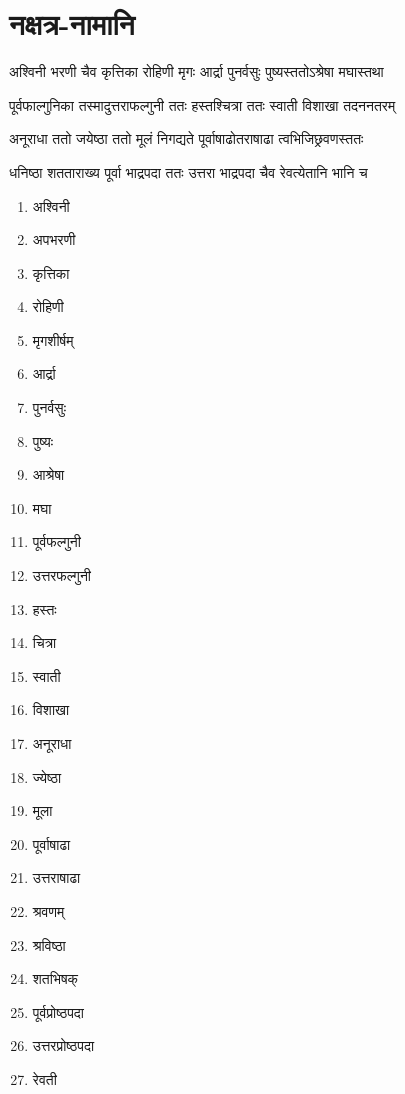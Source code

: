 \section{नक्षत्र-नामानि}
\label{app:nakshatra_names}

\twolineshloka
{अश्विनी भरणी चैव कृत्तिका रोहिणी मृगः}
{आर्द्रा पुनर्वसुः पुष्यस्ततोऽश्रेषा मघास्तथा}

\twolineshloka
{पूर्वफाल्गुनिका तस्मादुत्तराफल्गुनी ततः}
{हस्तश्चित्रा ततः स्वाती विशाखा तदननतरम्}

\twolineshloka
{अनूराधा ततो जयेष्ठा ततो मूलं निगद्यते}
{पूर्वाषाढोतराषाढा त्वभिजिछ्रवणस्ततः}

\twolineshloka
{धनिष्ठा शतताराख्य पूर्वा भाद्रपदा ततः}
{उत्तरा भाद्रपदा चैव रेवत्येतानि भानि च}


\begin{multicols}{2}
\begin{enumerate}
\item अश्विनी
\item अपभरणी
\item कृत्तिका
\item रोहिणी
\item मृगशीर्षम्
\item आर्द्रा
\item पुनर्वसुः
\item पुष्यः
\item आश्रेषा
\item मघा
\item पूर्वफल्गुनी
\item उत्तरफल्गुनी
\item हस्तः
\item चित्रा
\item स्वाती
\item विशाखा
\item अनूराधा
\item ज्येष्ठा
\item मूला
\item पूर्वाषाढा
\item उत्तराषाढा
\item श्रवणम्
\item श्रविष्ठा
\item शतभिषक्
\item पूर्वप्रोष्ठपदा
\item उत्तरप्रोष्ठपदा
\item रेवती
\end{enumerate}
\end{multicols}